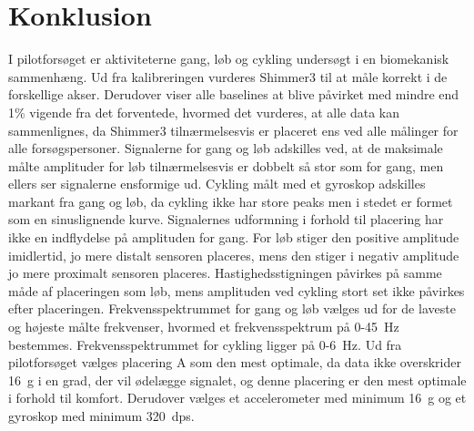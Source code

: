 \section{Konklusion}
I pilotforsøget er aktiviteterne gang, løb og cykling undersøgt i en biomekanisk sammenhæng. Ud fra kalibreringen vurderes Shimmer3 til at måle korrekt i de forskellige akser. Derudover viser alle baselines at blive påvirket med mindre end 1\% vigende fra det forventede, hvormed det vurderes, at alle data kan sammenlignes, da Shimmer3 tilnærmelsesvis er placeret ens ved alle målinger for alle forsøgspersoner. \newline
Signalerne for gang og løb adskilles ved, at de maksimale målte amplituder for løb tilnærmelsesvis er dobbelt så stor som for gang, men ellers ser signalerne ensformige ud. Cykling målt med et gyroskop adskilles markant fra gang og løb, da cykling ikke har store peaks men i stedet er formet som en sinuslignende kurve. \newline
Signalernes udformning i forhold til placering har ikke en indflydelse på amplituden for gang. For løb stiger den positive amplitude imidlertid, jo mere distalt sensoren placeres, mens den stiger i negativ amplitude jo mere proximalt sensoren placeres. Hastighedsstigningen påvirkes på samme måde af placeringen som løb, mens amplituden ved cykling stort set ikke påvirkes efter placeringen. \newline
Frekvensspektrummet for gang og løb vælges ud for de laveste og højeste målte frekvenser, hvormed et frekvensspektrum på 0-45~Hz bestemmes. Frekvensspektrummet for cykling ligger på 0-6~Hz.\newline
Ud fra pilotforsøget vælges placering A som den mest optimale, da data ikke overskrider 16~g i en grad, der vil ødelægge signalet, og denne placering er den mest optimale i forhold til komfort. Derudover vælges et accelerometer med minimum 16~g og et gyroskop med minimum 320~dps.
